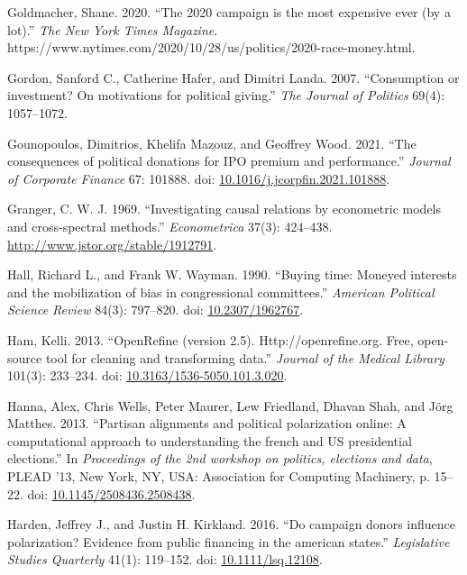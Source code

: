 \documentclass[12pt,]{article}
\newlength{\cslhangindent}
\newenvironment{CSLReferences}[2]%
    {\setlength{\parindent}{0pt}%
    \everypar{\setlength{\hangindent}{\cslhangindent}}\ignorespaces}%
    {\par}
\begin{document}
\begin{CSLReferences}{1}{0}
\leavevmode{}%
Goldmacher, Shane. 2020. {``The 2020 campaign is the most expensive ever
(by a lot).''} \emph{The New York Times Magazine}.
https://www.nytimes.com/2020/10/28/us/politics/2020-race-money.html.

\leavevmode{}%
Gordon, Sanford C., Catherine Hafer, and Dimitri Landa. 2007.
{``Consumption or investment? On motivations for political giving.''}
\emph{The Journal of Politics} 69(4): 1057--1072.

\leavevmode{}%
Gounopoulos, Dimitrios, Khelifa Mazouz, and Geoffrey Wood. 2021. {``The
consequences of political donations for IPO premium and performance.''}
\emph{Journal of Corporate Finance} 67: 101888. doi:
\href{https://doi.org/10.1016/j.jcorpfin.2021.101888}{10.1016/j.jcorpfin.2021.101888}.

\leavevmode{}%
Granger, C. W. J. 1969. {``Investigating causal relations by econometric
models and cross-spectral methods.''} \emph{Econometrica} 37(3):
424--438. \url{http://www.jstor.org/stable/1912791}.

\leavevmode{}%
Hall, Richard L., and Frank W. Wayman. 1990. {``Buying time: Moneyed
interests and the mobilization of bias in congressional committees.''}
\emph{American Political Science Review} 84(3): 797--820. doi:
\href{https://doi.org/10.2307/1962767}{10.2307/1962767}.

\leavevmode{}%
Ham, Kelli. 2013. {``OpenRefine (version 2.5). Http://openrefine.org.
Free, open-source tool for cleaning and transforming data.''}
\emph{Journal of the Medical Library} 101(3): 233--234. doi:
\href{https://doi.org/10.3163/1536-5050.101.3.020}{10.3163/1536-5050.101.3.020}.

\leavevmode{}%
Hanna, Alex, Chris Wells, Peter Maurer, Lew Friedland, Dhavan Shah, and
Jörg Matthes. 2013. {``Partisan alignments and political polarization
online: A computational approach to understanding the french and US
presidential elections.''} In \emph{Proceedings of the 2nd workshop on
politics, elections and data}, PLEAD '13, New York, NY, USA: Association
for Computing Machinery, p. 15--22. doi:
\href{https://doi.org/10.1145/2508436.2508438}{10.1145/2508436.2508438}.

\leavevmode{}%
Harden, Jeffrey J., and Justin H. Kirkland. 2016. {``Do campaign donors
influence polarization? Evidence from public financing in the american
states.''} \emph{Legislative Studies Quarterly} 41(1): 119--152. doi:
\href{https://doi.org/10.1111/lsq.12108}{10.1111/lsq.12108}.


\end{CSLReferences}
\end{document}
